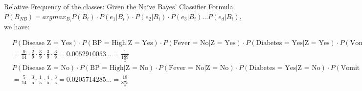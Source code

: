 \documentclass{book}
\begin{document}
\vspace{1mm}
Relative Frequency of the classes:
\vspace{1mm}
Given the Naïve Bayes' Classifier Formula \(P(B_{NB}) = argmax_{B_i} P(B_i) \cdot P(e_1|B_i) \cdot P(e_2|B_i) \cdot P(e_3|B_i) \ldots P(e_d|B_i)\), we have:

\begin{align*}
    & P(\text{Disease Z = Yes}) \cdot P(\text{BP = High}|\text{Z = Yes}) \cdot P(\text{Fever = No}|\text{Z = Yes}) \cdot P(\text{Diabetes = Yes}|\text{Z = Yes}) \cdot P(\text{Vomit = Yes}|\text{Z = Yes}) \\
    & = \frac{9}{14} \cdot \frac{2}{9} \cdot \frac{3}{9} \cdot \frac{3}{9} \cdot \frac{3}{9} = 0.0052910053\ldots = \underline{\underline{\frac{1}{189}}} 
\end{align*}
\begin{align*}
    & P(\text{Disease Z = No}) \cdot P(\text{BP = High}|\text{Z = No}) \cdot P(\text{Fever = No}|\text{Z = No}) \cdot P(\text{Diabetes = Yes}|\text{Z = No}) \cdot P(\text{Vomit = Yes}|\text{Z = No}) \\
    & = \frac{5}{14} \cdot \frac{3}{5} \cdot \frac{1}{5} \cdot \frac{4}{5} \cdot \frac{3}{5} = 0.0205714285\ldots = \underline{\underline{\frac{18}{875}}}
\end{align*}
\end{document}
